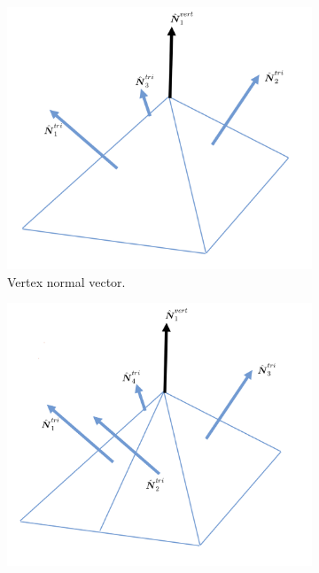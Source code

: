 \documentclass[11pt]{article}
\numberwithin{equation}{section}
\begin{document}
\begin{figure}[t]
  \centering
  \begin{subfigure}[b]{.3\linewidth}
    \centering
    \includegraphics[width=\linewidth]{normal_vertex.png}%
    \caption{Vertex normal vector.}
    \label{normalvert1}
  \end{subfigure}
  \hfill
  \begin{subfigure}[b]{.3\linewidth}
    \centering
    \includegraphics[width=\linewidth]{normal_vertex_2.png}%

\end{subfigure}
\end{figure}
\end{document}
